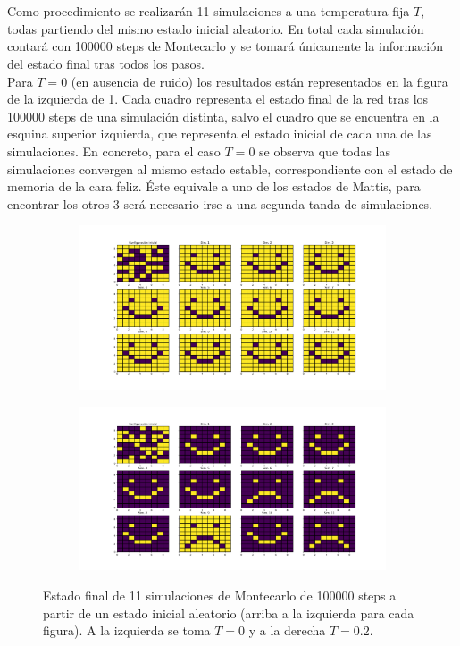 \documentclass[titlepage,12pt]{article}
\numberwithin{equation}{section}
\begin{document}
	\\
	\\
    Como procedimiento se realizarán 11 simulaciones a una temperatura fija $T$, todas partiendo del mismo estado inicial aleatorio. En total cada simulación contará con 100000 steps de Montecarlo y se tomará únicamente la información del estado final tras todos los pasos.
    \\
    Para $T = 0$ (en ausencia de ruido) los resultados están representados en la figura de la izquierda de \ref{Mattis-Low-T}. Cada cuadro representa el estado final de la red tras los 100000 steps de una simulación distinta, salvo el cuadro que se encuentra en la esquina superior izquierda, que representa el estado inicial de cada una de las simulaciones. En concreto, para el caso $T = 0$ se observa que todas las simulaciones convergen al mismo estado estable, correspondiente con el estado de memoria de la cara feliz. Éste equivale a uno de los estados de Mattis, para encontrar los otros 3 será necesario irse a una segunda tanda de simulaciones.
	\begin{figure}
	    \centering
	    \begin{subfigure}{.45\textwidth}
	    \centering
	    \includegraphics[width=\linewidth]{9x9_T=0.png}
	    \end{subfigure}%
	    \begin{subfigure}{.45\linewidth}
	    \centering
	    \includegraphics[width=\linewidth]{9x9_T=0,2.png}
	    \end{subfigure}%
	    \caption{Estado final de 11 simulaciones de Montecarlo de 100000 steps a partir de un estado inicial aleatorio (arriba a la izquierda para cada figura). A la izquierda se toma $T = 0$ y a la derecha $T = 0.2$.}
	    \label{Mattis-Low-T}
	\end{figure}
\end{document}

